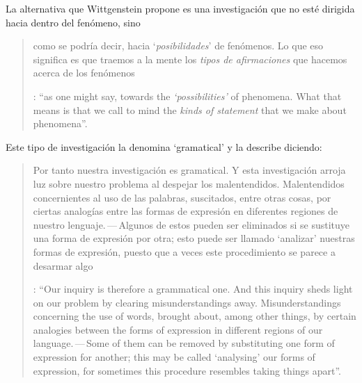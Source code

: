 La alternativa que Wittgenstein propone es una investigación que no esté dirigida hacia dentro del fenómeno, sino \blockquote[{\Cite[\S90]{wittgenstein1953phiinv}}: \enquote{as one might say, towards the \emph{`possibilities'} of phenomena. What that means is that we call to mind the \emph{kinds of statement} that we make about phenomena}.]{como se podría decir, hacia `\emph{posibilidades}' de fenómenos. Lo que eso significa es que traemos a la mente los \emph{tipos de afirmaciones} que hacemos acerca de los fenómenos}. Este tipo de investigación la denomina `gramatical' y la describe diciendo: \blockquote[{\Cite[\S90]{wittgenstein1953phiinv}}: \enquote{Our inquiry is therefore a grammatical one. And this inquiry sheds light on our problem by clearing misunderstandings away. Misunderstandings concerning the use of words, brought about, among other things, by certain analogies between the forms of expression in different regions of our language.\,---\,Some of them can be removed by substituting one form of expression for another; this may be called `analysing' our forms of expression, for sometimes this procedure resembles taking things apart}.]{Por tanto nuestra investigación es gramatical. Y esta investigación arroja luz sobre nuestro problema al despejar los malentendidos. Malentendidos concernientes al uso de las palabras, suscitados, entre otras cosas, por ciertas analogías entre las formas de expresión en diferentes regiones de nuestro lenguaje.\,---\,Algunos de estos pueden ser eliminados si se sustituye una forma de expresión por otra; esto puede ser llamado `analizar' nuestras formas de expresión, puesto que a veces este procedimiento se parece a desarmar algo}.

